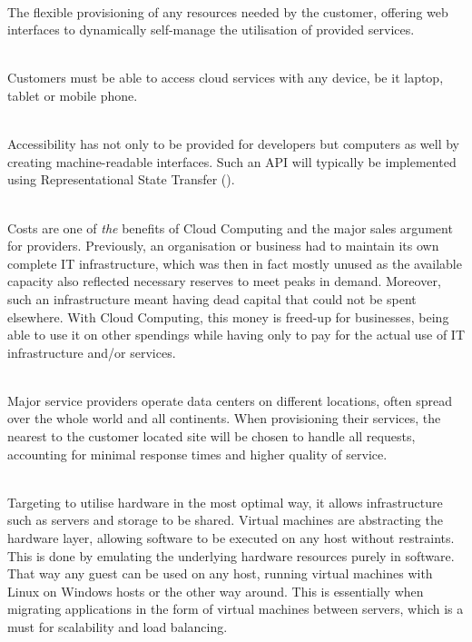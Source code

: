 \begin{description}
	\itemsep2mm
	\item[Agility] \hfill \\
		The flexible provisioning of any resources needed by the customer, offering web interfaces to dynamically self-manage the utilisation of provided services.
	\item[Device Independence] \hfill \\
		Customers must be able to access cloud services with any device, be it laptop, tablet or mobile phone.
\pagebreak
	\item[Application Programming Interface (\abk{API}{Application Programming Interface})] \hfill \\
		Accessibility has not only to be provided for developers but computers as well by creating machine-readable interfaces. Such an API will typically be implemented using Representational State Transfer ().
	\item[Costs] \label{item:costs} \hfill \\
		Costs are one of \textit{the} benefits of Cloud Computing and the major sales argument for providers. Previously, an organisation or business had to maintain its own complete IT infrastructure, which was then in fact mostly unused as the available capacity also reflected necessary reserves to meet peaks in demand. Moreover, such an infrastructure meant having dead capital that could not be spent elsewhere. With Cloud Computing, this money is freed-up for businesses, being able to use it on other spendings while having only to pay for the actual use of IT infrastructure and/or services.
	\item[Geographical Diversification] \hfill \\
		Major service providers operate data centers on different locations, often spread over the whole world and all continents. When provisioning their services, the nearest to the customer located site will be chosen to handle all requests, accounting for minimal response times and higher quality of service.
	\item[Virtualisation] \hfill \\
		Targeting to utilise hardware in the most optimal way, it allows infrastructure such as servers and storage to be shared. Virtual machines are abstracting the hardware layer, allowing software to be executed on any host without restraints. This is done by emulating the underlying hardware resources purely in software. That way any guest can be used on any host, running virtual machines with Linux on Windows hosts or the other way around. This is essentially when migrating applications in the form of virtual machines between servers, which is a must for scalability and load balancing.

\end{description}
